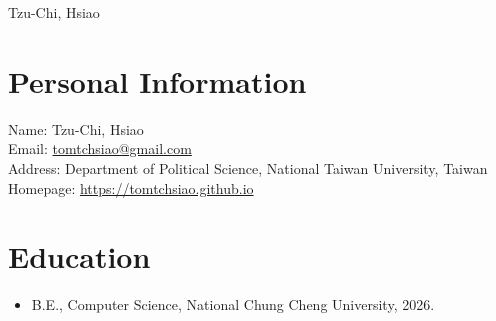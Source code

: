 \documentclass[a4paper,14pt]{ctexart}
\begin{document}
\fontsize{16pt}{16pt}\selectfont
\begin{center}
\LARGE Tzu-Chi, Hsiao
\end{center}
\fontsize{14pt}{14pt}\selectfont
\section*{Personal Information}
    \begin{flushleft}
    Name: Tzu-Chi, Hsiao \\
    Email: \href{mailto:tomtchsiao@gmail.com}{tomtchsiao@gmail.com} \\
    Address: Department of Political Science, National Taiwan University, Taiwan \\
    Homepage: \href{https://tomtchsiao.github.io}{https://tomtchsiao.github.io} \\
    \end{flushleft}
\section*{Education}
\flushleft
\begin{itemize}[leftmargin=0.5in]
\item B.E., Computer Science, National Chung Cheng University, 2026.
\end{itemize}
\end{document}
